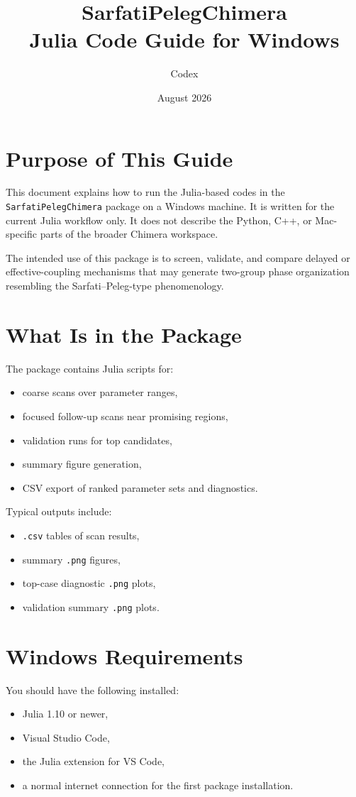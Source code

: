 \documentclass[11pt,a4paper]{article}
\title{\textbf{\color{TitleBlue}SarfatiPelegChimera}\\[0.3em]
\large Julia Code Guide for Windows}
\author{Codex}
\date{August 2026}
\begin{document}
\maketitle
\tableofcontents
\bigskip

\section{Purpose of This Guide}
This document explains how to run the Julia-based codes in the
\texttt{SarfatiPelegChimera} package on a Windows machine. It is written for the
current Julia workflow only. It does not describe the Python, C++, or Mac-specific
parts of the broader Chimera workspace.

\begin{infobox}
The intended use of this package is to screen, validate, and compare delayed or
effective-coupling mechanisms that may generate two-group phase organization
resembling the Sarfati--Peleg-type phenomenology.
\end{infobox}

\section{What Is in the Package}
The package contains Julia scripts for:
\begin{itemize}[leftmargin=1.5em]
    \item coarse scans over parameter ranges,
    \item focused follow-up scans near promising regions,
    \item validation runs for top candidates,
    \item summary figure generation,
    \item CSV export of ranked parameter sets and diagnostics.
\end{itemize}

Typical outputs include:
\begin{itemize}[leftmargin=1.5em]
    \item \texttt{.csv} tables of scan results,
    \item summary \texttt{.png} figures,
    \item top-case diagnostic \texttt{.png} plots,
    \item validation summary \texttt{.png} plots.
\end{itemize}

\section{Windows Requirements}
You should have the following installed:
\begin{itemize}[leftmargin=1.5em]
    \item Julia 1.10 or newer,
    \item Visual Studio Code,
    \item the Julia extension for VS Code,
    \item a normal internet connection for the first package installation.
\end{itemize}
\end{document}
